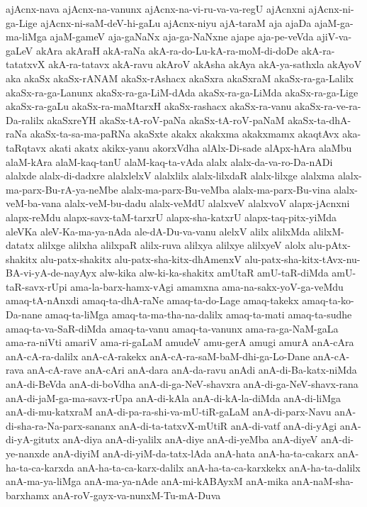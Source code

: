 {ajAcnx-nava
ajAcnx-na-vanunx
ajAcnx-na-vi-ru-va-va-regU
ajAcnxni
ajAcnx-ni-ga-Lige
ajAcnx-ni-saM-deV-hi-gaLu
ajAcnx-niyu
ajA-taraM
aja
ajaDa
ajaM-ga-ma-liMga
ajaM-gameV
aja-gaNaNx
aja-ga-NaNxne
ajape
aja-pe-veVda
ajiV-va-gaLeV
akAra
akAraH
akA-raNa
akA-ra-do-Lu-kA-ra-moM-di-doDe
akA-ra-tatatxvX
akA-ra-tatavx
akA-ravu
akAroV
akAsha
akAya
akA-ya-sathxla
akAyoV
aka
akaSx
akaSx-rANAM
akaSx-rAshacx
akaSxra
akaSxraM
akaSx-ra-ga-Lalilx
akaSx-ra-ga-Lanunx
akaSx-ra-ga-LiM-dAda
akaSx-ra-ga-LiMda
akaSx-ra-ga-Lige
akaSx-ra-gaLu
akaSx-ra-maMtarxH
akaSx-rashacx
akaSx-ra-vanu
akaSx-ra-ve-ra-Da-ralilx
akaSxreYH
akaSx-tA-roV-paNa
akaSx-tA-roV-paNaM
akaSx-ta-dhA-raNa
akaSx-ta-sa-ma-paRNa
akaSxte
akakx
akakxma
akakxmamx
akaqtAvx
aka-taRqtavx
akati
akatx
akikx-yanu
akorxVdha
alAlx-Di-sade
alApx-hAra
alaMbu
alaM-kAra
alaM-kaq-tanU
alaM-kaq-ta-vAda
alalx
alalx-da-va-ro-Da-nADi
alalxde
alalx-di-dadxre
alalxlelxV
alalxlilx
alalx-lilxdaR
alalx-lilxge
alalxma
alalx-ma-parx-Bu-rA-ya-neMbe
alalx-ma-parx-Bu-veMba
alalx-ma-parx-Bu-vina
alalx-veM-ba-vana
alalx-veM-bu-dadu
alalx-veMdU
alalxveV
alalxvoV
alapx-jAcnxni
alapx-reMdu
alapx-savx-taM-tarxrU
alapx-sha-katxrU
alapx-taq-pitx-yiMda
aleVKa
aleV-Ka-ma-ya-nAda
ale-dA-Du-va-vanu
alelxV
alilx
alilxMda
alilxM-datatx
alilxge
alilxha
alilxpaR
alilx-ruva
alilxya
alilxye
alilxyeV
alolx
alu-pAtx-shakitx
alu-patx-shakitx
alu-patx-sha-kitx-dhAmenxV
alu-patx-sha-kitx-tAvx-nu-BA-vi-yA-de-nayAyx
alw-kika
alw-ki-ka-shakitx
amUtaR
amU-taR-diMda
amU-taR-savx-rUpi
ama-la-barx-hamx-vAgi
amamxna
ama-na-sakx-yoV-ga-veMdu
amaq-tA-nAnxdi
amaq-ta-dhA-raNe
amaq-ta-do-Lage
amaq-takekx
amaq-ta-ko-Da-nane
amaq-ta-liMga
amaq-ta-ma-tha-na-dalilx
amaq-ta-mati
amaq-ta-sudhe
amaq-ta-va-SaR-diMda
amaq-ta-vanu
amaq-ta-vanunx
ama-ra-ga-NaM-gaLa
ama-ra-niVti
amariV
ama-ri-gaLaM
amudeV
amu-gerA
amugi
amurA
anA-cAra
anA-cA-ra-dalilx
anA-cA-rakekx
anA-cA-ra-saM-baM-dhi-ga-Lo-Dane
anA-cA-rava
anA-cA-rave
anA-cAri
anA-dara
anA-da-ravu
anAdi
anA-di-Ba-katx-niMda
anA-di-BeVda
anA-di-boVdha
anA-di-ga-NeV-shavxra
anA-di-ga-NeV-shavx-rana
anA-di-jaM-ga-ma-savx-rUpa
anA-di-kAla
anA-di-kA-la-diMda
anA-di-liMga
anA-di-mu-katxraM
anA-di-pa-ra-shi-va-mU-tiR-gaLaM
anA-di-parx-Navu
anA-di-sha-ra-Na-parx-sananx
anA-di-ta-tatxvX-mUtiR
anA-di-vatf
anA-di-yAgi
anA-di-yA-gitutx
anA-diya
anA-di-yalilx
anA-diye
anA-di-yeMba
anA-diyeV
anA-di-ye-nanxde
anA-diyiM
anA-di-yiM-da-tatx-lAda
anA-hata
anA-ha-ta-cakarx
anA-ha-ta-ca-karxda
anA-ha-ta-ca-karx-dalilx
anA-ha-ta-ca-karxkekx
anA-ha-ta-dalilx
anA-ma-ya-liMga
anA-ma-ya-nAde
anA-mi-kABAyxM
anA-mika
anA-naM-sha-barxhamx
anA-roV-gayx-va-nunxM-Tu-mA-Duva
}

